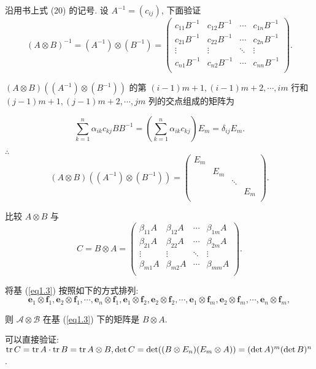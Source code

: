 \documentclass[color=black,device=normal,lang=cn,mode=geye]{elegantnote}
\begin{document}
\begin{solution}
    沿用书上式 (20) 的记号. 设 $A^{-1}=(c_{ij})$, 下面验证
    \[(A\otimes B)^{-1}=(A^{-1})\otimes(B^{-1})=\begin{pmatrix}
        c_{11}B^{-1} & c_{12}B^{-1} & \cdots & c_{1n}B^{-1} \\
        c_{21}B^{-1} & c_{22}B^{-1} & \cdots & c_{2n}B^{-1} \\
        \vdots & \vdots & \ddots & \vdots \\
        c_{n1}B^{-1} & c_{n2}B^{-1} & \cdots & c_{nn}B^{-1} \\
    \end{pmatrix}.\]

    $(A\otimes B)((A^{-1})\otimes(B^{-1}))$ 的第 $(i-1)m+1,(i-1)m+2,\cdots,im$ 行和 $(j-1)m+1,(j-1)m+2,\cdots,jm$ 列的交点组成的矩阵为

    \[\sum\limits_{k=1}^n\alpha_{ik}c_{kj}BB^{-1}=\left(\sum\limits_{k=1}^n\alpha_{ik}c_{kj}\right)E_m=\delta_{ij}E_m.\]

    $\therefore$
    \[(A\otimes B)((A^{-1})\otimes(B^{-1}))=\begin{pmatrix}
        E_m \\
        & E_m \\
        && \ddots \\
        &&& E_m \\
    \end{pmatrix}.\]
\end{solution}
\begin{exercise}%
    比较 $A\otimes B$ 与
    \[C=B\otimes A=\begin{pmatrix}
        \beta_{11}A & \beta_{12}A & \cdots & \beta_{1m}A \\
        \beta_{21}A & \beta_{22}A & \cdots & \beta_{2m}A \\
        \vdots & \vdots & \ddots & \vdots \\
        \beta_{m1}A & \beta_{m2}A & \cdots & \beta_{mm}A \\
    \end{pmatrix}.\]
\end{exercise}
\begin{solution}
    将基 (\ref{eq1.3}) 按照如下的方式排列:
    \[\boldsymbol{e}_1\otimes\boldsymbol{f}_1,\boldsymbol{e}_2\otimes\boldsymbol{f}_1,\cdots,\boldsymbol{e}_n\otimes\boldsymbol{f}_1,\boldsymbol{e}_1\otimes\boldsymbol{f}_2,\boldsymbol{e}_2\otimes\boldsymbol{f}_2,\cdots,\boldsymbol{e}_1\otimes\boldsymbol{f}_m,\boldsymbol{e}_2\otimes\boldsymbol{f}_m,\cdots,\boldsymbol{e}_n\otimes\boldsymbol{f}_m,\]

    则
    $\mathcal{A}\otimes\mathcal{B}$ 在基 (\ref{eq1.3}) 下的矩阵是 $B\otimes A$.

    可以直接验证: $\operatorname{tr} C=\operatorname{tr} A\cdot\operatorname{tr} B=\operatorname{tr} A\otimes B,\det C=\det((B\otimes E_n)(E_m\otimes A))=(\det A)^m(\det B)^n$.
\end{solution}
\end{document}
